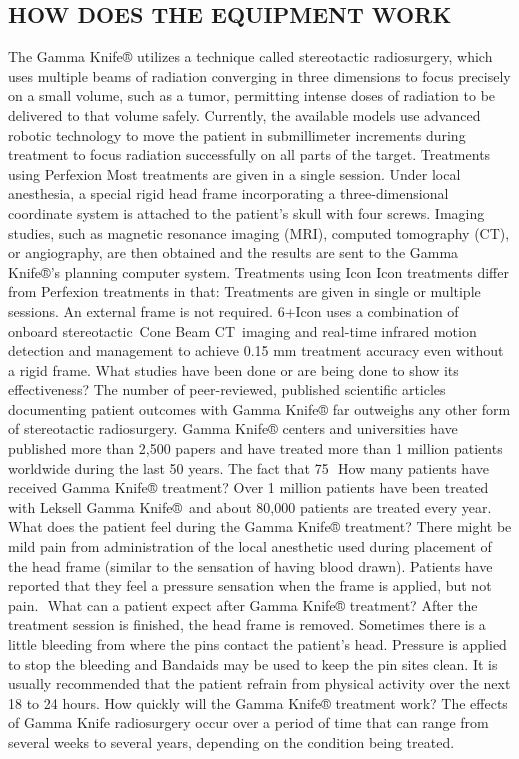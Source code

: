\documentclass[12pt]{article}
\begin{document}
 \subsection{HOW DOES THE EQUIPMENT WORK}
 The Gamma Knife® utilizes a technique called stereotactic radiosurgery, which uses multiple beams of radiation converging in three dimensions to focus precisely on a small volume, such as a tumor, permitting intense doses of radiation to be delivered to that volume safely. Currently, the available models use advanced robotic technology to move the patient in submillimeter increments during treatment to focus radiation successfully on all parts of the target.
Treatments using Perfexion
Most treatments are given in a single session. Under local anesthesia, a special rigid head frame incorporating a three-dimensional coordinate system is attached to the patient's skull with four screws. Imaging studies, such as magnetic resonance imaging (MRI), computed tomography (CT), or angiography, are then obtained and the results are sent to the Gamma Knife®'s planning computer system.
Treatments using Icon
Icon treatments differ from Perfexion treatments in that:
Treatments are given in single or multiple sessions.
An external frame is not required.
6+Icon uses a combination of onboard stereotactic Cone Beam CT imaging and real-time infrared motion detection and management to achieve 0.15 mm treatment accuracy even without a rigid frame.
What studies have been done or are being done to show its effectiveness?
The number of peer-reviewed, published scientific articles documenting patient outcomes with Gamma Knife® far outweighs any other form of stereotactic radiosurgery. Gamma Knife® centers and universities have published more than 2,500 papers and have treated more than 1 million patients worldwide during the last 50 years. The fact that 75%
 How many patients have received Gamma Knife® treatment?
Over 1 million patients have been treated with Leksell Gamma Knife® and about 80,000 patients are treated every year.
What does the patient feel during the Gamma Knife® treatment?
There might be mild pain from administration of the local anesthetic used during placement of the head frame (similar to the sensation of having blood drawn). Patients have reported that they feel a pressure sensation when the frame is applied, but not pain.
 What can a patient expect after Gamma Knife® treatment?
After the treatment session is finished, the head frame is removed. Sometimes there is a little bleeding from where the pins contact the patient’s head. Pressure is applied to stop the bleeding and Bandaids may be used to keep the pin sites clean. It is usually recommended that the patient refrain from physical activity over the next 18 to 24 hours.
How quickly will the Gamma Knife® treatment work?
The effects of Gamma Knife radiosurgery occur over a period of time that can range from several weeks to several years, depending on the condition being treated.
\end{document}
